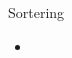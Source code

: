 

\ifkompendium\else

\begin{Slide}{Sortering}\SlideFontSmall
\begin{itemize}
\item 
\end{itemize}

\end{Slide}


\fi











